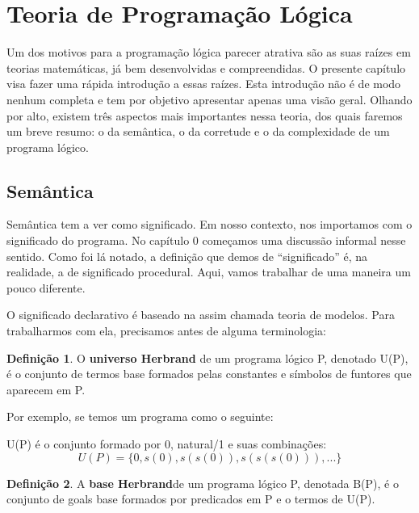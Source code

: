 \documentclass{article}
\theoremstyle{definition}
\newtheorem{definition}{Definição}[section]
\theoremstyle{remark}
\begin{document}
\section{Teoria de Programação Lógica}

Um dos motivos para a programação lógica parecer atrativa são as suas raízes em teorias matemáticas, já bem desenvolvidas e compreendidas. O presente capítulo visa fazer uma rápida introdução a essas raízes. Esta introdução não é de modo nenhum completa e tem por objetivo apresentar apenas uma visão geral. Olhando por alto, existem três aspectos mais importantes nessa teoria, dos quais faremos um breve resumo: o da semântica, o da corretude e o da complexidade de um programa lógico.

\subsection{Semântica}
Semântica tem a ver como significado. Em nosso contexto, nos importamos com o significado do programa. No capítulo 0 %
começamos uma discussão informal nesse sentido. Como foi lá notado, a definição que demos de ``significado'' é, na realidade, a de significado procedural. Aqui, vamos trabalhar de uma maneira um pouco diferente.

O significado declarativo é baseado na assim chamada teoria de modelos. Para trabalharmos com ela, precisamos antes de alguma terminologia:

\begin{definition} O \textbf{universo Herbrand} de um programa lógico P, denotado U(P), é o conjunto de termos base formados pelas constantes e símbolos de funtores que aparecem em P.
\end{definition}

Por exemplo, se temos um programa como o seguinte:


\label{lst:natural}

U(P) é o conjunto formado por 0, natural/1 e suas combinações:
\[
  U(P) = \{0, s(0), s(s(0)), s(s(s(0))), ...\} %
\]

\begin{definition} A \textbf{base Herbrand}de um programa lógico P, denotada B(P), é o conjunto de goals base formados por predicados em P e o termos de U(P).
\end{definition}
\end{document}
